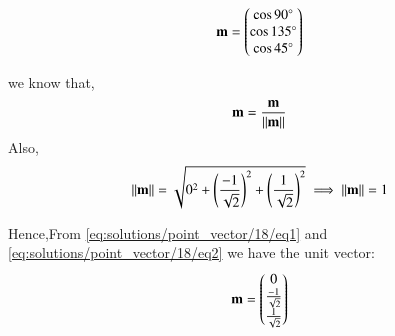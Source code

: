  
 \begin{align}
 \mathbf m = \begin{pmatrix}\cos 90\degree     \\ \cos 135\degree\\ \cos45\degree\end{pmatrix}
 \label{eq:solutions/point_vector/18/eq1}
 \end{align}

we know that,
\begin{equation}
  \mathbf m=\frac{\mathbf m }{\left\lVert\mathbf m \right\rVert}
\end{equation}
Also,
\begin{equation}
{\left\lVert\mathbf m \right\rVert}= \sqrt{0^2+\left(\frac{-1}{\sqrt{2}}\right)^2+\left(\frac{1}{\sqrt{2}}\right)^2} 
\implies{\left\lVert\mathbf m \right\rVert}=1
\label{eq:solutions/point_vector/18/eq2}
\end{equation}

 Hence,From \eqref{eq:solutions/point_vector/18/eq1} and \eqref{eq:solutions/point_vector/18/eq2} we have the unit vector:
 \begin{align}
\mathbf m  = \begin{pmatrix} 0 \\ \frac{-1} {\sqrt{2}}\\ \frac{1}{\sqrt{2}}\end{pmatrix}
  \end{align}



